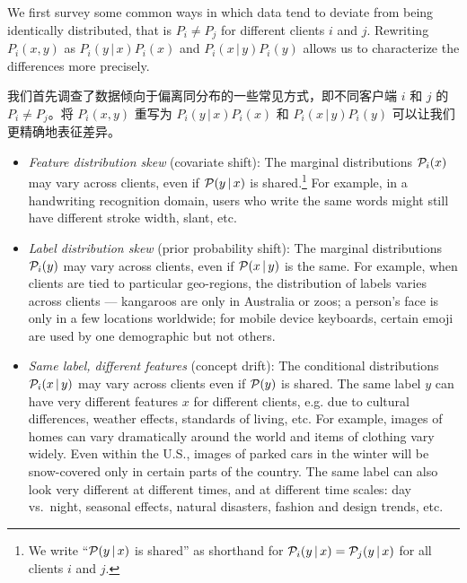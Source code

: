 \newcommand{\gvn}{\,|\,}

We first survey some common ways in which data tend to deviate from being identically distributed, that is $P_i \neq P_j$ for different clients $i$ and $j$. Rewriting $P_i(x, y)$ as $P_i(y \gvn x) P_i(x)$ and $P_i(x \gvn y) P_i(y)$ allows us to characterize the differences more precisely.

我们首先调查了数据倾向于偏离同分布的一些常见方式，即不同客户端 $i$ 和 $j$ 的 $P_i \neq P_j$。将 $P_i(x, y)$ 重写为 $P_i(y \gvn x) P_i(x)$ 和 $P_i(x \gvn y) P_i(y)$ 可以让我们更精确地表征差异。

\begin{itemize}
    \item \emph{Feature distribution skew} (covariate shift): The marginal distributions $\mathcal{P}_i(x)$ may vary across clients, even if $\Ploc(y \gvn x)$ is shared.\footnote{We write ``$\Ploc(y \gvn x)$ is shared'' as shorthand for $\Ploc_i(y \gvn x) = \Ploc_j(y \gvn x)$  for all clients $i$ and $j$.} For example, in a handwriting recognition domain, users who write the same words might still have different stroke width, slant, etc. 
    
    \item \emph{Label distribution skew} (prior probability shift): The marginal distributions $\mathcal{P}_i(y)$ may vary across clients, even if $\Ploc(x \gvn y)$ is the same. For example, when clients are tied to particular geo-regions, the distribution of labels varies across clients --- kangaroos are only in Australia or zoos; a person's face is only in a few locations worldwide; for mobile device keyboards, certain emoji are used by one demographic but not others.
    
    \item \emph{Same label, different features} (concept drift): The conditional distributions $\Ploc_i(x \gvn y)$ may vary across clients even if $\mathcal{P}(y)$ is shared. The same label $y$ can have very different features $x$ for different clients, e.g. due to cultural differences, weather effects, standards of living, etc.
    For example, images of homes can vary dramatically around the world and items of clothing vary widely.  
    Even within the U.S., images of parked cars in the winter will be snow-covered only in certain parts of the country.  
    The same label can also look very different at different times, and at different time scales: day vs.~night, seasonal effects, natural disasters, fashion and design trends, etc.
    

\end{itemize}
